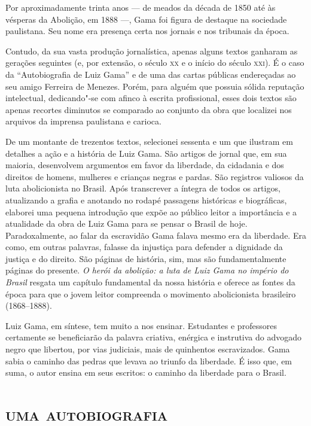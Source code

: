Por aproximadamente trinta anos --- de meados da década de 1850 até às
vésperas da Abolição, em 1888 ---, Gama foi figura de destaque na
sociedade paulistana. Seu nome era presença certa nos jornais e nos
tribunais da época.

Contudo, da sua vasta produção jornalística, apenas alguns textos
ganharam as gerações seguintes (e, por extensão, o século \textsc{xx} e o início
do século \textsc{xxi}). É o caso da ``Autobiografia de Luiz Gama'' e de uma das
cartas públicas endereçadas ao seu amigo Ferreira de Menezes. Porém,
para alguém que possuia sólida reputação intelectual, dedicando"-se com
afinco à escrita profissional, esses dois textos são apenas recortes
diminutos se comparado ao conjunto da obra que localizei nos arquivos da
imprensa paulistana e carioca.

De um montante de trezentos textos, selecionei sessenta e um que
ilustram em detalhes a ação e a história de Luiz Gama. São artigos de
jornal que, em sua maioria, desenvolvem argumentos em favor da
liberdade, da cidadania e dos direitos de homens, mulheres e crianças
negras e pardas. São registros valiosos da luta abolicionista no Brasil.
Após transcrever a íntegra de todos os artigos, atualizando a grafia e
anotando no rodapé passagens históricas e biográficas, elaborei uma
pequena introdução que expõe ao público leitor a importância e a
atualidade da obra de Luiz Gama para se pensar o Brasil de hoje.
Paradoxalmente, ao falar da escravidão Gama falava mesmo era da
liberdade. Era como, em outras palavras, falasse da injustiça para
defender a dignidade da justiça e do direito. São páginas de história,
sim, mas são fundamentalmente páginas do presente. \emph{O herói
da abolição: a luta de Luiz Gama no império do Brasil} resgata um capítulo
fundamental da nossa história e oferece as fontes da época para que o
jovem leitor compreenda o movimento abolicionista brasileiro
(1868--1888).

Luiz Gama, em síntese, tem muito a nos ensinar. Estudantes e professores
certamente se beneficiarão da palavra criativa, enérgica e instrutiva do
advogado negro que libertou, por vias judiciais, mais de quinhentos
escravizados. Gama sabia o caminho das pedras que levava ao triunfo da
liberdade. É isso que, em suma, o autor ensina em seus escritos: o
caminho da liberdade para o Brasil.


\paginabranca
\begingroup\makeatletter\@openrightfalse
\part{\textsc{uma autobiografia}}

